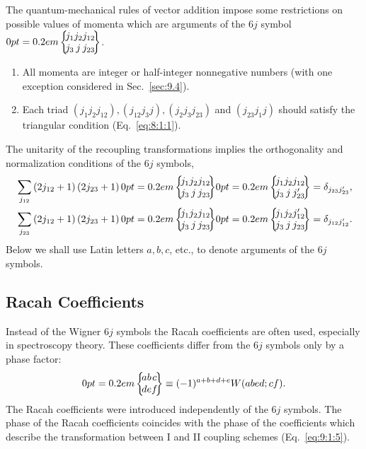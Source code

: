 The quantum-mechanical rules of vector addition impose some restrictions on possible values of momenta which are arguments of the $6 j$ symbol $\sixj{j_{1}}{j_{2}}{j_{12}}{j_{3}}{j}{j_{23}}$.
\begin{enumerate}[label=(\alph*)]
\item All momenta are integer or half-integer nonnegative numbers (with one exception considered in Sec.~\ref{sec:9.4}).
\item Each triad $\left(j_{1} j_{2} j_{12}\right),\left(j_{12} j_{3} j\right),\left(j_{2} j_{3} j_{23}\right)$ and $\left(j_{23} j_{1} j\right)$ should satisfy the triangular condition (Eq.~\eqref{eq:8:1:1}). 
\end{enumerate}
The unitarity of the recoupling transformations implies the orthogonality and normalization conditions of the $6 j$ symbols,
\begin{align}
& \sum_{j_{12}}\left(2 j_{12}+1\right)\left(2 j_{23}+1\right)\sixj{j_{1}}{j_{2}}{j_{12}}{j_{3}}{j}{j_{23}}\sixj{j_{1}}{j_{2}}{j_{12}}{j_{3}}{j}{j_{23}^{\prime}}=\delta_{j_{23} j_{23}^{\prime}} , \label{eq:9:1:9}\\
& \sum_{j_{23}}\left(2 j_{12}+1\right)\left(2 j_{23}+1\right)\sixj{j_{1}}{j_{2}}{j_{12}}{j_{3}}{j}{j_{23}}\sixj{j_{1}}{j_{2}}{j_{12}^{\prime}}{j_{3}}{j}{j_{23}}=\delta_{j_{12} j_{12}^{\prime}} . \label{eq:9:1:10}
\end{align}
Below we shall use Latin letters $a, b, c$, etc., to denote arguments of the $6 j$ symbols.

\subsection{Racah Coefficients}\label{sec:9.1.2}
Instead of the Wigner $6 j$ symbols the Racah coefficients \cite{ref091} are often used, especially in spectroscopy theory. These coefficients differ from the $6 j$ symbols only by a phase factor:
\begin{equation}
\sixj{a}{b}{c}{d}{e}{f}  \label{eq:9:1:11} \equiv(-1)^{a+b+d+e} W(a b e d ; c f) .
\end{equation}
The Racah coefficients were introduced independently of the $6 j$ symbols. The phase of the Racah coefficients coincides with the phase of the coefficients which describe the transformation between I and II coupling schemes (Eq.~\eqref{eq:9:1:5}).

